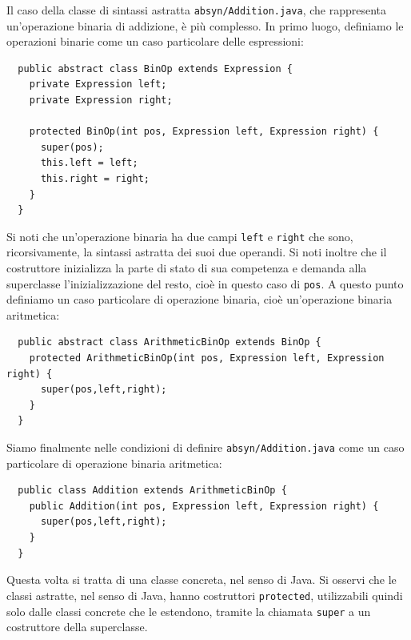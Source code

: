 Il caso della classe di sintassi astratta \texttt{absyn/Addition.java}, che
rappresenta un'operazione binaria di addizione, \`e
pi\`u complesso. In primo luogo, definiamo le operazioni binarie come un
caso particolare delle espressioni:
%
\begin{verbatim}
  public abstract class BinOp extends Expression {
    private Expression left;
    private Expression right;

    protected BinOp(int pos, Expression left, Expression right) {
      super(pos);
      this.left = left;
      this.right = right;
    }
  }
\end{verbatim}
%
Si noti che un'operazione binaria ha due campi \texttt{left} e \texttt{right}
che sono, ricorsivamente, la sintassi astratta dei suoi due operandi.
Si noti inoltre che il costruttore inizializza la parte di stato di sua
competenza e demanda alla superclasse l'inizializzazione del resto, cio\`e in
questo caso di \texttt{pos}.
A questo punto definiamo un caso particolare di operazione binaria,
cio\`e un'operazione binaria aritmetica:
%
\begin{verbatim}
  public abstract class ArithmeticBinOp extends BinOp {
    protected ArithmeticBinOp(int pos, Expression left, Expression right) {
      super(pos,left,right);
    }
  }
\end{verbatim}
%
Siamo finalmente nelle condizioni di definire \texttt{absyn/Addition.java}
come un caso particolare di operazione binaria aritmetica:
%
\begin{verbatim}
  public class Addition extends ArithmeticBinOp {
    public Addition(int pos, Expression left, Expression right) {
      super(pos,left,right);
    }
  }
\end{verbatim}
%
Questa volta si tratta di una classe concreta, nel senso di Java.
Si osservi che le classi
astratte, nel senso di Java, hanno costruttori \texttt{protected},
utilizzabili quindi solo dalle classi concrete che le estendono,
tramite la chiamata \texttt{super} a un costruttore della superclasse.


